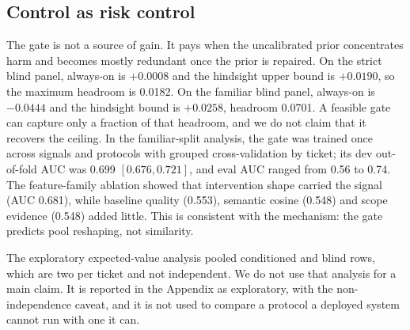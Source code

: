 \subsection{Control as risk control}
The gate is not a source of gain. It pays when the uncalibrated prior concentrates
harm and becomes mostly redundant once the prior is repaired. On the strict blind
panel, always-on is $+0.0008$ and the hindsight upper bound is $+0.0190$, so the
maximum headroom is 0.0182. On the familiar blind panel, always-on is $-0.0444$ and
the hindsight bound is $+0.0258$, headroom 0.0701. A feasible gate can capture only a
fraction of that headroom, and we do not claim that it recovers the ceiling. In the
familiar-split analysis, the gate was trained once across signals and protocols with
grouped cross-validation by ticket; its dev out-of-fold AUC was 0.699
$[0.676,0.721]$, and eval AUC ranged from 0.56 to 0.74. The feature-family
ablation showed that intervention shape carried the signal (AUC 0.681), while
baseline quality (0.553), semantic cosine (0.548) and scope evidence (0.548) added
little. This is consistent with the mechanism: the gate
predicts pool reshaping, not similarity.

The exploratory expected-value analysis pooled conditioned and blind
rows, which are two per ticket and not independent. We do not use that analysis for
a main claim. It is reported in the Appendix as exploratory, with the
non-independence caveat, and it is not used to compare a protocol a deployed system
cannot run with one it can.
